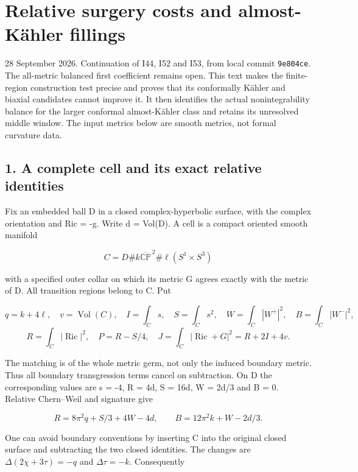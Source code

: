 \documentclass[
  10pt,
]{article}
\author{}
\date{}
\begin{document}
\hypertarget{relative-surgery-costs-and-almost-kuxe4hler-fillings}{%
\section{Relative surgery costs and almost-Kähler
fillings}\label{relative-surgery-costs-and-almost-kuxe4hler-fillings}}

28 September 2026. Continuation of I44, I52 and I53, from local commit
\texttt{9e804ce}. The all-metric balanced first coefficient remains
open. This text makes the finite-region construction test precise and
proves that its conformally Kähler and biaxial candidates cannot improve
it. It then identifies the actual nonintegrability balance for the
larger conformal almost-Kähler class and retains its unresolved middle
window. The input metrics below are smooth metrics, not formal curvature
data.

\hypertarget{a-complete-cell-and-its-exact-relative-identities}{%
\subsection{1. A complete cell and its exact relative
identities}\label{a-complete-cell-and-its-exact-relative-identities}}

Fix an embedded ball D in a closed complex-hyperbolic surface, with the
complex orientation and Ric = -g. Write d = Vol(D). A cell is a compact
oriented smooth manifold

\[
 C=D\#k\overline{\mathbb {CP}}^{\,2}\#\ell(S^1\times S^3)
\]

with a specified outer collar on which its metric G agrees exactly with
the metric of D. All transition regions belong to C. Put

\[
 q=k+4\ell,\quad v=\operatorname{Vol}(C),\quad
 I=\int_Cs,\quad S=\int_Cs^2,\quad
 W=\int_C|W^+|^2,\quad B=\int_C|W^-|^2,
\] \[
 R=\int_C|\operatorname{Ric}|^2,\quad
 P=R-S/4,\quad J=\int_C|\operatorname{Ric}+G|^2=R+2I+4v.
\]

The matching is of the whole metric germ, not only the induced boundary
metric. Thus all boundary transgression terms cancel on subtraction. On
D the corresponding values are s = -4, R = 4d, S = 16d, W = 2d/3 and B =
0. Relative Chern--Weil and signature give

\[
 \boxed{R=8\pi^2q+S/3+4W-4d,\qquad
 B=12\pi^2k+W-2d/3.}                                      \tag{1.1}
\]

One can avoid boundary conventions by inserting C into the original
closed surface and subtracting the two closed identities. The changes
are \(\Delta(2\chi+3\tau)=-q\) and \(\Delta\tau=-k\). Consequently
\end{document}
